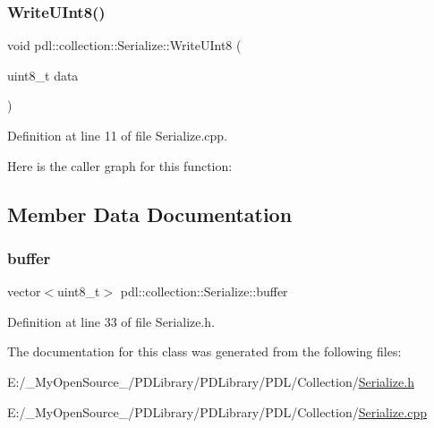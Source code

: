 \subsubsection{\texorpdfstring{WriteUInt8()}{WriteUInt8()}}
{\footnotesize\ttfamily void pdl\+::collection\+::\+Serialize\+::\+Write\+U\+Int8 (\begin{DoxyParamCaption}\item[{uint8\+\_\+t}]{data }\end{DoxyParamCaption})}



Definition at line 11 of file Serialize.\+cpp.


\begin{DoxyCode}{0}

\end{DoxyCode}
Here is the caller graph for this function\+:


\subsection{Member Data Documentation}
\mbox{\label{classpdl_1_1collection_1_1_serialize_a133ff59777261b053c59d77129bc26db}} 
\subsubsection{\texorpdfstring{buffer}{buffer}}
{\footnotesize\ttfamily vector$<$uint8\+\_\+t$>$ pdl\+::collection\+::\+Serialize\+::buffer\hspace{0.3cm}{\ttfamily [private]}}



Definition at line 33 of file Serialize.\+h.



The documentation for this class was generated from the following files\+:\begin{DoxyCompactItemize}
\item 
E\+:/\+\_\+\+My\+Open\+Source\+\_\+/\+P\+D\+Library/\+P\+D\+Library/\+P\+D\+L/\+Collection/\mbox{\hyperlink{_serialize_8h}{Serialize.\+h}}\item 
E\+:/\+\_\+\+My\+Open\+Source\+\_\+/\+P\+D\+Library/\+P\+D\+Library/\+P\+D\+L/\+Collection/\mbox{\hyperlink{_serialize_8cpp}{Serialize.\+cpp}}\end{DoxyCompactItemize}
